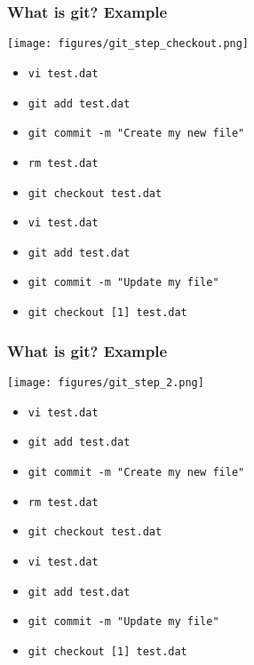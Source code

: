 \documentclass[xcolor=dvipsnames,10pt]{beamer}
\begin{document}
\addtocounter{framenumber}{-1}
\begin{frame}
 \frametitle{What is git? Example}
 
 \begin{center}
  \texttt{[image: figures/git\_step\_checkout.png]}
 \end{center}
 \vspace*{-0.5cm}
 
 \begin{itemize}
  \color{gray}
  \item[] \texttt{vi test.dat}
  \item[] \texttt{git add test.dat}
  \item[] \texttt{git commit -m "Create my new file"}
  \item[] \texttt{rm test.dat}
  \color{black}
  \item   \texttt{git checkout test.dat}
  \color{white}
  \item[] \texttt{vi test.dat}
  \item[] \texttt{git add test.dat}
  \item[] \texttt{git commit -m "Update my file"}
  \item[] \texttt{git checkout [1] test.dat}
 \end{itemize}

\end{frame}
\addtocounter{framenumber}{-1}
\begin{frame}
 \frametitle{What is git? Example}
 
 \begin{center}
  \texttt{[image: figures/git\_step\_2.png]}
 \end{center}
 \vspace*{-0.5cm}
 
 \begin{itemize}
  \color{gray}
  \item[] \texttt{vi test.dat}
  \item[] \texttt{git add test.dat}
  \item[] \texttt{git commit -m "Create my new file"}
  \item[] \texttt{rm test.dat}
  \item[] \texttt{git checkout test.dat}
  \color{black}
  \item   \texttt{vi test.dat}
  \color{white}
  \item[] \texttt{git add test.dat}
  \item[] \texttt{git commit -m "Update my file"}
  \item[] \texttt{git checkout [1] test.dat}
 \end{itemize}

\end{frame}
\end{document}
